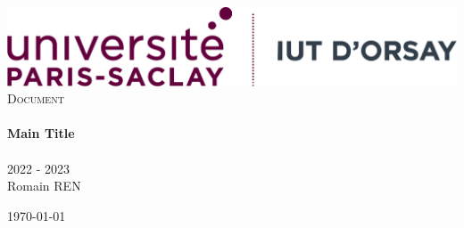 \pagestyle{fancy}
\fancyhf{}
\lfoot{} %
\cfoot{} %

\begin{titlepage}
\vbox{ }

\begin{center}
    \includegraphics[width=1\textwidth]{logo-iutorsay.png}\\[4cm]
    \textsc{\Large Document}\\[0.7cm]

    \noindent\makebox[\linewidth]{\rule{.7\paperwidth}{.6pt}}\\[0.7cm]
    { \huge \bfseries Main Title}\\[0.25cm]
    \noindent\makebox[\linewidth]{\rule{.7\paperwidth}{.6pt}}\\[0.7cm]
    \large{2022 - 2023}\\[1.2cm]
    \vfill
    \large
    Romain REN

    \bigskip
    {\large \today}
\end{center}
\end{titlepage}


